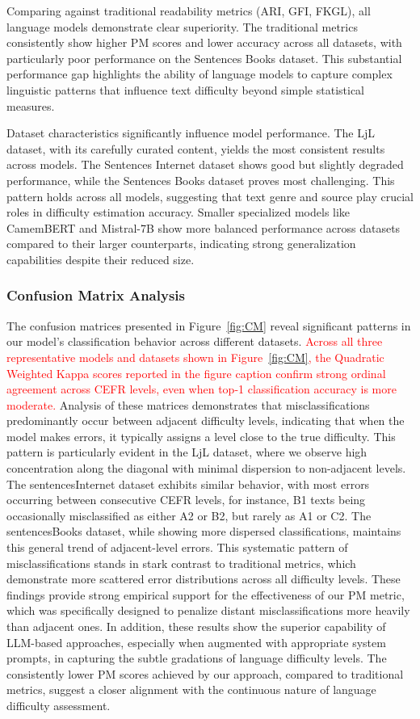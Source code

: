 Comparing against traditional readability metrics (ARI, GFI, FKGL), all language models demonstrate clear superiority. The traditional metrics consistently show higher PM scores and lower accuracy across all datasets, with particularly poor performance on the Sentences Books dataset. This substantial performance gap highlights the ability of language models to capture complex linguistic patterns that influence text difficulty beyond simple statistical measures.

Dataset characteristics significantly influence model performance. The LjL dataset, with its carefully curated content, yields the most consistent results across models. The Sentences Internet dataset shows good but slightly degraded performance, while the Sentences Books dataset proves most challenging. This pattern holds across all models, suggesting that text genre and source play crucial roles in difficulty estimation accuracy. Smaller specialized models like CamemBERT and Mistral-7B show more balanced performance across datasets compared to their larger counterparts, indicating strong generalization capabilities despite their reduced size.

\subsubsection{Confusion Matrix Analysis}
The confusion matrices presented in Figure~\ref{fig:CM} reveal significant patterns in our model's classification behavior across different datasets. \textcolor{red}{Across all three representative models and datasets shown in Figure~\ref{fig:CM}, the Quadratic Weighted Kappa scores reported in the figure caption confirm strong ordinal agreement across CEFR levels, even when top-1 classification accuracy is more moderate.} Analysis of these matrices demonstrates that misclassifications predominantly occur between adjacent difficulty levels, indicating that when the model makes errors, it typically assigns a level close to the true difficulty. This pattern is particularly evident in the LjL dataset, where we observe high concentration along the diagonal with minimal dispersion to non-adjacent levels. The sentencesInternet dataset exhibits similar behavior, with most errors occurring between consecutive CEFR levels, for instance, B1 texts being occasionally misclassified as either A2 or B2, but rarely as A1 or C2. The sentencesBooks dataset, while showing more dispersed classifications, maintains this general trend of adjacent-level errors. This systematic pattern of misclassifications stands in stark contrast to traditional metrics, which demonstrate more scattered error distributions across all difficulty levels. These findings provide strong empirical support for the effectiveness of our PM metric, which was specifically designed to penalize distant misclassifications more heavily than adjacent ones. In addition, these results show the superior capability of LLM-based approaches, especially when augmented with appropriate system prompts, in capturing the subtle gradations of language difficulty levels. The consistently lower PM scores achieved by our approach, compared to traditional metrics, suggest a closer alignment with the continuous nature of language difficulty assessment.

